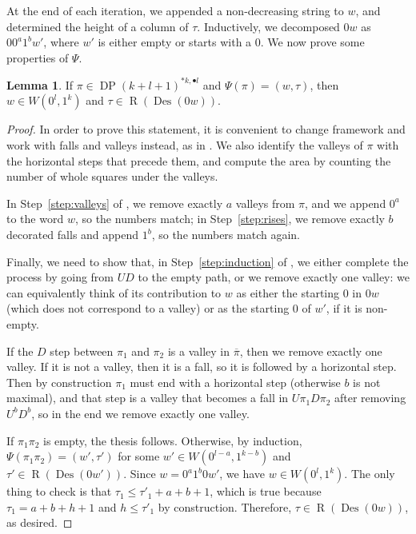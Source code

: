 \documentclass[reqno]{amsart}
\theoremstyle{plain}
\theoremstyle{definition}
\newtheorem{lemma}[theorem]{Lemma}
\theoremstyle{remark}
\DeclareMathOperator{\R}{R}
\DeclareMathOperator{\DP}{DP}
\DeclareMathOperator{\Des}{Des}
\newcommand{\<}{\langle}
\renewcommand{\>}{\rangle}
\begin{document}
At the end of each iteration, we appended a non-decreasing string to $w$, and determined the height of a column of $\tau$. Inductively, we decomposed $0w$ as $0 0^a 1^b w'$, where $w'$ is either empty or starts with a $0$. We now prove some properties of $\Psi$.

\begin{lemma}
    \label{lem:well-defined}
    If $\pi \in \DP(k+l+1)^{\ast k, \bullet l}$ and $\Psi(\pi) = (w,\tau)$, then $w \in W(0^l,1^k)$ and $\tau \in \R(\Des(0w))$.
\end{lemma}

\begin{proof}
    In order to prove this statement, it is convenient to change framework and work with falls and valleys instead, as in . We also identify the valleys of $\pi$ with the horizontal steps that precede them, and compute the area by counting the number of whole squares under the valleys.

    In Step~\ref{step:valleys} of , we remove exactly $a$ valleys from $\pi$, and we append $0^a$ to the word $w$, so the numbers match; in Step~\ref{step:rises}, we remove exactly $b$ decorated falls and append $1^b$, so the numbers match again.

    Finally, we need to show that, in Step~\ref{step:induction} of ,
    we either complete the process by going from $UD$ to the empty path, or we
    remove exactly one valley: we can equivalently think of its contribution to $w$ as either the starting $0$ in $0w$ (which does not correspond to a valley) or as the starting $0$ of $w'$, if it is non-empty.
    
    If the $D$ step between $\pi_1$ and $\pi_2$ is a valley in $\overline{\pi}$, then we remove exactly one valley. If it is not a valley, then it is a fall, so it is followed by a horizontal step. Then by construction $\pi_1$ must end with a horizontal step (otherwise $b$ is not maximal), and that step is a valley that becomes a fall in $U \pi_1 D \pi_2$ after removing $U^b D^b$, so in the end we remove exactly one valley.

    If $\pi_1 \pi_2$ is empty, the thesis follows. Otherwise, by induction, $\Psi(\pi_1 \pi_2) = (w',\tau')$ for some $w' \in W(0^{l-a},1^{k-b})$ and $\tau' \in \R(\Des(0w'))$. Since $w = 0^a 1^b 0 w'$, we have $w \in W(0^l,1^k)$. The only thing to check is that $\tau_1 \leq \tau'_1 + a + b + 1$, which is true because $\tau_1 = a + b + h + 1$ and $h \leq \tau'_1$ by construction. Therefore, $\tau \in \R(\Des(0w))$, as desired.
\end{proof}
\end{document}
